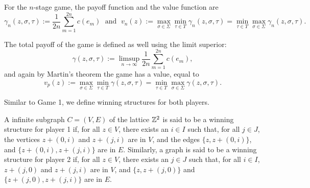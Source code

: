         For the $n$-stage game, the payoff function and the value function are
        \[
           \gamma_n(z, \sigma, \tau) := \frac{1}{2n}\sum_{m = 1}^{2n}c(e_m) \; \text{ and } \; v_n(z) := \max_{\sigma \in \Sigma}\min_{\tau \in T} \gamma_n(z, \sigma, \tau) = \min_{\tau \in T}\max_{\sigma \in \Sigma} \gamma_n(z, \sigma, \tau).
        \]

        The total payoff of the game is defined as well using the limit superior:
        \begin{equation}\label{payoff-game1}
            \gamma(z, \sigma, \tau) := \limsup_{n \to \infty}\frac{1}{2n}\sum_{m = 1}^{2n}c(e_m),
        \end{equation}
        and again by Martin's theorem the game has a value, equal to
        \[
            v_p(z) := \max_{\sigma \in \Sigma}\min_{\tau \in T} \gamma(z, \sigma, \tau) = \min_{\tau \in T}\max_{\sigma \in \Sigma} \gamma(z, \sigma, \tau).
        \]

        

        Similar to Game 1, we define winning structures for both players.

        \begin{definition}\label{def-right-structure-game2}
            A infinite subgraph $C = (V, E)$ of the lattice $\mathbb{Z}^2$ is said to be a winning structure for player 1 if, for all $z \in V$, there exists an $i \in I$ such that, for all $j \in J$, the vertices $z + (0, i)$ and $z + (j, i)$ are in $V$,  and the edges $\{z, z + (0, i)\}$, and $\{z + (0, i), z + (j, i)\}$ are in $E$. Similarly, a graph is said to be a winning structure for player 2 if, for all $z \in V$, there exists an $j \in J$ such that, for all $i \in I$,  $z + (j, 0)$ and $z + (j, i)$ are in $V$, and $\{z, z + (j, 0)\}$ and $\{z + (j, 0), z + (j, i)\}$ are in $E$.
        \end{definition}

